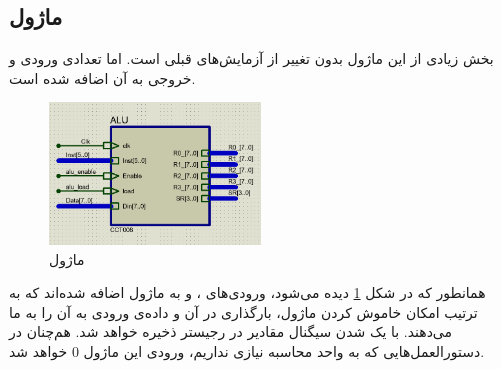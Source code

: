 \documentclass[12pt,onecolumn,a4paper,fleqn]{article}
\begin{document}
	\subsection{ماژول }
	بخش زیادی از این ماژول بدون تغییر از آزمایش‌های قبلی است. اما تعدادی ورودی و خروجی به آن اضافه شده است.
	\begin{figure}[H]
		\centering
		\includegraphics[width=0.5\textwidth]{source/alu_interface.png}
		\caption{ماژول }
		\label{fig:alu-interface}
	\end{figure}
	همانطور که در شکل \ref{fig:alu-interface} دیده می‌شود، ورودی‌های 
	،
	و
	به ماژول اضافه شده‌اند که به ترتیب امکان خاموش کردن ماژول، بارگذاری در آن و داده‌ی ورودی به آن را به ما می‌دهند. با یک شدن سیگنال  مقادیر  در رجیستر 
	ذخیره خواهد شد. هم‌چنان در دستورالعمل‌هایی که به واحد محاسبه نیازی نداریم، ورودی 
	این ماژول $0$ خواهد شد.
	
\end{document}

